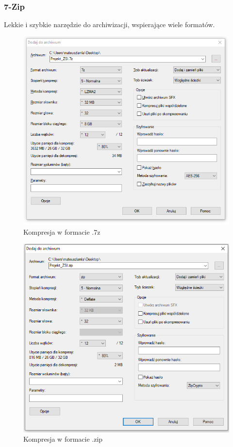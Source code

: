 \documentclass[0.82pt,a4paper]{article}
\begin{document}
\subsubsection{7-Zip}
    Lekkie i szybkie narzędzie do archiwizacji, wspierające wiele formatów.
    \begin{figure}[H]
        \centering
        \includegraphics[width=0.8\linewidth]{media/7zip/1_kompresja_7z.PNG}
        \caption[]{Kompresja w formacie .7z}
        \label{fig:7z_kompresja_7z}
    \end{figure}

    \begin{figure}[H]
        \centering
        \includegraphics[width=0.8\linewidth]{media/7zip/2_kompresja_zip.PNG}
        \caption[]{Kompresja w formacie .zip}
        \label{fig:7z_kompresja_zip}
    \end{figure}
\end{document}
